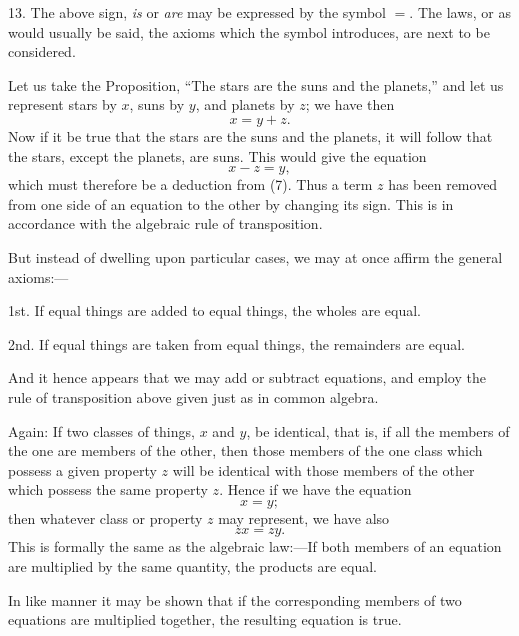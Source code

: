 \documentclass[oneside]{book}
\begin{document}
13. The above sign, \textit{is}  or \textit{are} may be expressed by the symbol
$=$. The laws, or as would usually be said, the axioms which
the symbol introduces, are next to be considered.

Let us take the Proposition, ``The stars are the suns and the
planets,'' and let us represent stars by $x$, suns by $y$, and planets
by $z$; we have then
\begin{equation}
x=y + z.
\end{equation}
Now if it be true that the stars are the suns and the planets, it
will follow that the stars, except the planets, are suns. This
would give the equation
\begin{equation}
x - z = y,
\end{equation}
which must therefore be a deduction from (7). Thus a term $z$
has been removed from one side of an equation to the other by
changing its sign. This is in accordance with the algebraic rule
of transposition.

But instead of dwelling upon particular cases, we may at once
affirm the general axioms:---

1st. If equal things are added to equal things, the wholes are
equal.

2nd. If equal things are taken from equal things, the remainders
are equal.

And it hence appears that we may add or subtract equations,
and employ the rule of transposition above given just as in common
algebra.

Again: If two classes of things, $x$ and $y$, be identical, that is,
if all the members of the one are members of the other, then
those members of the one class which possess a given property $z$
will be identical with those members of the other which possess
the same property $z$. Hence if we have the equation
\[
x = y;
\]
then whatever class or property $z$ may represent, we have also
\[
zx = zy.
\]
This is formally the same as the algebraic law:---If both members
of an equation are multiplied by the same quantity, the
products are equal.

In like manner it may be shown that if the corresponding
members of two equations are multiplied together, the resulting
equation is true.
\end{document}
